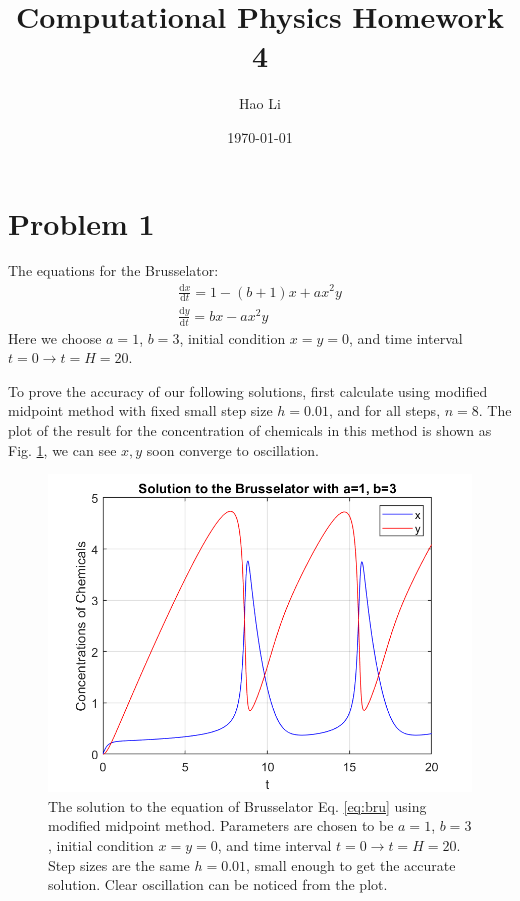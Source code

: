 \documentclass[12pt, graphicx]{article}
\begin{document}
\title{Computational Physics Homework 4}
\author{Hao Li\footnotemark[2]}
\date{\today}


\maketitle

\section*{Problem 1}
The equations for the Brusselator:
\begin{equation}
\begin{gathered}
\frac{\mathrm{d}x}{\mathrm{d}t}=1-(b+1)x+ax^2y\\
\frac{\mathrm{d}y}{\mathrm{d}t}=bx-ax^2y
\end{gathered}
\label{eq:bru}
\end{equation}
Here we choose $a=1$, $b=3$, initial condition $x=y=0$, and time interval $t=0\to t=H=20$.\par
To prove the accuracy of our following solutions, first calculate using modified midpoint method with fixed small step size $h=0.01$, and for all steps, $n=8$. The plot of the result for the concentration of chemicals in this method is shown as Fig. \ref{fig:bru_mod}, we can see $x,y$ soon converge to oscillation. 

\begin{figure}[ht]
\centering
\includegraphics[width = 120mm]{Brusselator_mod_mid.png}
\caption{The solution to the equation of Brusselator Eq. \ref{eq:bru} using modified midpoint method. Parameters are chosen to be $a=1$, $b=3$, initial condition $x=y=0$, and time interval $t=0\to t=H=20$. Step sizes are the same $h=0.01$, small enough to get the accurate solution. Clear oscillation can be noticed from the plot.}
\label{fig:bru_mod}
\end{figure}
\end{document}
